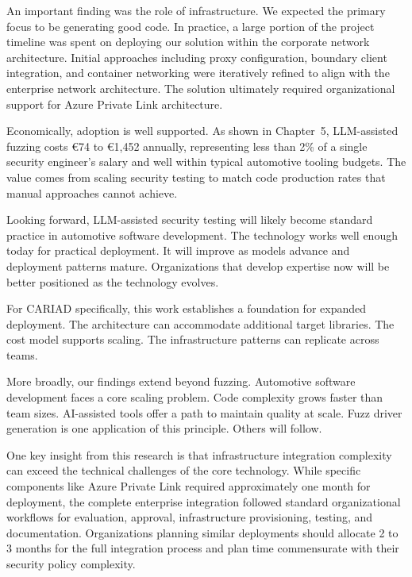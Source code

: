 An important finding was the role of infrastructure. We expected the primary focus to be generating good code. In practice, a large portion of the project timeline was spent on deploying our solution within the corporate network architecture. Initial approaches including proxy configuration, boundary client integration, and container networking were iteratively refined to align with the enterprise network architecture. The solution ultimately required organizational support for Azure Private Link architecture.

Economically, adoption is well supported. As shown in Chapter~5, LLM-assisted fuzzing costs \euro{}74 to \euro{}1,452 annually, representing less than 2\% of a single security engineer's salary and well within typical automotive tooling budgets. The value comes from scaling security testing to match code production rates that manual approaches cannot achieve.

Looking forward, LLM-assisted security testing will likely become standard practice in automotive software development. The technology works well enough today for practical deployment. It will improve as models advance and deployment patterns mature. Organizations that develop expertise now will be better positioned as the technology evolves.

For CARIAD specifically, this work establishes a foundation for expanded deployment. The architecture can accommodate additional target libraries. The cost model supports scaling. The infrastructure patterns can replicate across teams.

More broadly, our findings extend beyond fuzzing. Automotive software development faces a core scaling problem. Code complexity grows faster than team sizes. AI-assisted tools offer a path to maintain quality at scale. Fuzz driver generation is one application of this principle. Others will follow.

One key insight from this research is that infrastructure integration complexity can exceed the technical challenges of the core technology. While specific components like Azure Private Link required approximately one month for deployment, the complete enterprise integration followed standard organizational workflows for evaluation, approval, infrastructure provisioning, testing, and documentation. Organizations planning similar deployments should allocate 2 to 3 months for the full integration process and plan time commensurate with their security policy complexity.